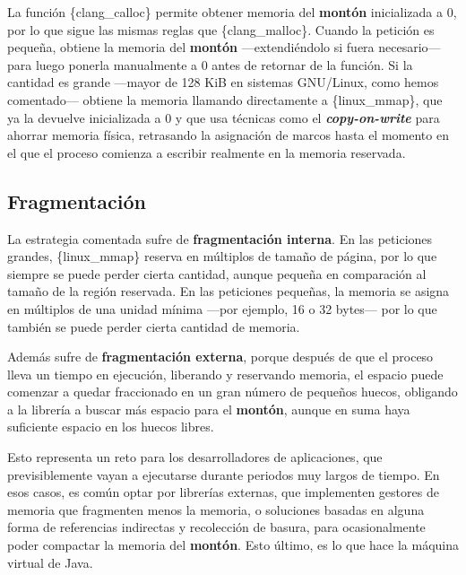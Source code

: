 La función \{clang\_calloc\} permite obtener memoria del \textbf{montón}
inicializada a 0, por lo que sigue las mismas reglas que
\{clang\_malloc\}. Cuando la petición es pequeña, obtiene la memoria del
\textbf{montón} ---extendiéndolo si fuera necesario--- para luego
ponerla manualmente a 0 antes de retornar de la función. Si la cantidad
es grande ---mayor de 128 KiB en sistemas GNU/Linux, como hemos
comentado--- obtiene la memoria llamando directamente a \{linux\_mmap\},
que ya la devuelve inicializada a 0 y que usa técnicas como el
\textbf{\emph{copy-on-write}} para ahorrar memoria física, retrasando la
asignación de marcos hasta el momento en el que el proceso comienza a
escribir realmente en la memoria reservada.

\subsection{Fragmentación}\label{_fragmentaciuxf3n}

La estrategia comentada sufre de \textbf{fragmentación interna}. En las
peticiones grandes, \{linux\_mmap\} reserva en múltiplos de tamaño de
página, por lo que siempre se puede perder cierta cantidad, aunque
pequeña en comparación al tamaño de la región reservada. En las
peticiones pequeñas, la memoria se asigna en múltiplos de una unidad
mínima ---por ejemplo, 16 o 32 bytes--- por lo que también se puede
perder cierta cantidad de memoria.

Además sufre de \textbf{fragmentación externa}, porque después de que el
proceso lleva un tiempo en ejecución, liberando y reservando memoria, el
espacio puede comenzar a quedar fraccionado en un gran número de
pequeños huecos, obligando a la librería a buscar más espacio para el
\textbf{montón}, aunque en suma haya suficiente espacio en los huecos
libres.

Esto representa un reto para los desarrolladores de aplicaciones, que
previsiblemente vayan a ejecutarse durante periodos muy largos de
tiempo. En esos casos, es común optar por librerías externas, que
implementen gestores de memoria que fragmenten menos la memoria, o
soluciones basadas en alguna forma de referencias indirectas y
recolección de basura, para ocasionalmente poder compactar la memoria
del \textbf{montón}. Esto último, es lo que hace la máquina virtual de
Java.
